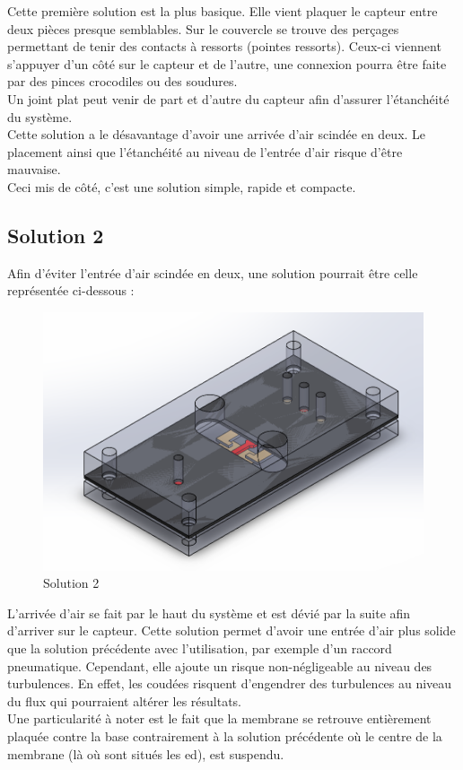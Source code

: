 Cette première solution est la plus basique. Elle vient plaquer le capteur entre deux pièces presque semblables. Sur le couvercle se trouve des
perçages permettant de tenir des contacts à ressorts (pointes ressorts). Ceux-ci viennent s'appuyer d'un côté sur le capteur et
de l'autre, une  connexion pourra être faite par des pinces crocodiles ou des soudures. \\
Un joint plat peut venir de part et d'autre du capteur afin d'assurer l'étanchéité du système.\\
Cette solution a le désavantage d'avoir une arrivée d'air scindée en deux. Le placement ainsi que l'étanchéité au niveau de l'entrée
d'air risque d'être mauvaise. \\
Ceci mis de côté, c'est une solution simple, rapide et compacte.

\subsection{Solution 2}
Afin d'éviter l'entrée d'air scindée en deux, une solution pourrait être celle représentée ci-dessous :
\begin{figure}[H]
    \centering
    \includegraphics[scale = 0.4]{images/Capteur_design2_caoutch.png}
    \caption{Solution 2}
    \label{fig:solution2}
\end{figure}
L'arrivée d'air se fait par le haut du système et est dévié par la suite afin d'arriver sur le capteur. Cette solution permet d'avoir une
entrée d'air plus solide que la solution précédente avec l'utilisation, par exemple d'un raccord pneumatique. Cependant, elle ajoute un risque 
non-négligeable au niveau des turbulences. En effet, les coudées risquent d'engendrer des turbulences au niveau du flux qui pourraient altérer 
les résultats.\\
Une particularité à noter est le fait que la membrane se retrouve entièrement plaquée contre la base contrairement à la solution
précédente où le centre de la membrane (là où sont situés les \gls{ed}), est suspendu.

